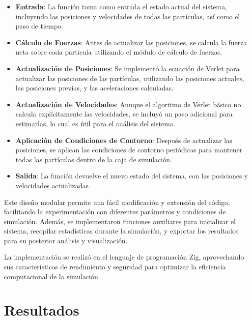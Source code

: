 \documentclass[twocolumn]{article}
\begin{document}
\begin{itemize}
    \item \textbf{Entrada}: La función toma como entrada el estado actual del sistema, incluyendo las posiciones y velocidades de todas las partículas, así como el paso de tiempo.

    \item \textbf{Cálculo de Fuerzas}: Antes de actualizar las posiciones, se calcula la fuerza neta sobre cada partícula utilizando el módulo de cálculo de fuerzas.

    \item \textbf{Actualización de Posiciones}: Se implementó la ecuación de Verlet para actualizar las posiciones de las partículas, utilizando las posiciones actuales, las posiciones previas, y las aceleraciones calculadas.

    \item \textbf{Actualización de Velocidades}: Aunque el algoritmo de Verlet básico no calcula explícitamente las velocidades, se incluyó un paso adicional para estimarlas, lo cual es útil para el análisis del sistema.

    \item \textbf{Aplicación de Condiciones de Contorno}: Después de actualizar las posiciones, se aplican las condiciones de contorno periódicas para mantener todas las partículas dentro de la caja de simulación.

    \item \textbf{Salida}: La función devuelve el nuevo estado del sistema, con las posiciones y velocidades actualizadas.
\end{itemize}

Este diseño modular permite una fácil modificación y extensión del código, facilitando la experimentación con diferentes parámetros y condiciones de simulación. Además, se implementaron funciones auxiliares para inicializar el sistema, recopilar estadísticas durante la simulación, y exportar los resultados para su posterior análisis y visualización.

La implementación se realizó en el lenguaje de programación Zig, aprovechando sus características de rendimiento y seguridad para optimizar la eficiencia computacional de la simulación.

\section{Resultados}
\end{document}
